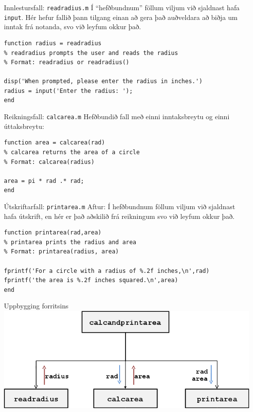 \documentclass[handout]{beamer}
\begin{document}
\begin{frame}[fragile]{Innlestursfall: \texttt{readradius.m}}
\vspace{\baselineskip}
Í ``hefðbundnum'' föllum viljum við sjaldnast hafa \texttt{input}. Hér hefur fallið þann tilgang einan að gera það auðveldara að biðja um inntak frá notanda, svo við leyfum okkur það.

\begin{verbatim}
function radius = readradius
% readradius prompts the user and reads the radius
% Format: readradius or readradius()

disp('When prompted, please enter the radius in inches.')
radius = input('Enter the radius: ');
end
\end{verbatim}
\end{frame}

\begin{frame}[fragile]{Reikningsfall: \texttt{calcarea.m}}
\vspace{\baselineskip}
Hefðbundið fall með einni inntaksbreytu og einni úttaksbreytu:

\begin{verbatim}
function area = calcarea(rad)
% calcarea returns the area of a circle
% Format: calcarea(radius)

area = pi * rad .* rad;
end
\end{verbatim}
\end{frame}

\begin{frame}[fragile]{Útskriftarfall: \texttt{printarea.m}}
\vspace{\baselineskip}
Aftur: Í hefðbundnum föllum viljum við sjaldnast hafa útskrift, en hér er það aðskilið frá reikningum svo við leyfum okkur það.

\begin{verbatim}
function printarea(rad,area)
% printarea prints the radius and area
% Format: printarea(radius, area)

fprintf('For a circle with a radius of %.2f inches,\n',rad)
fprintf('the area is %.2f inches squared.\n',area)
end
\end{verbatim}
\end{frame}

\begin{frame}{Uppbygging forritsins}
\includegraphics[width=\textwidth]{Pics/organization-example}
\end{frame}
\end{document}
